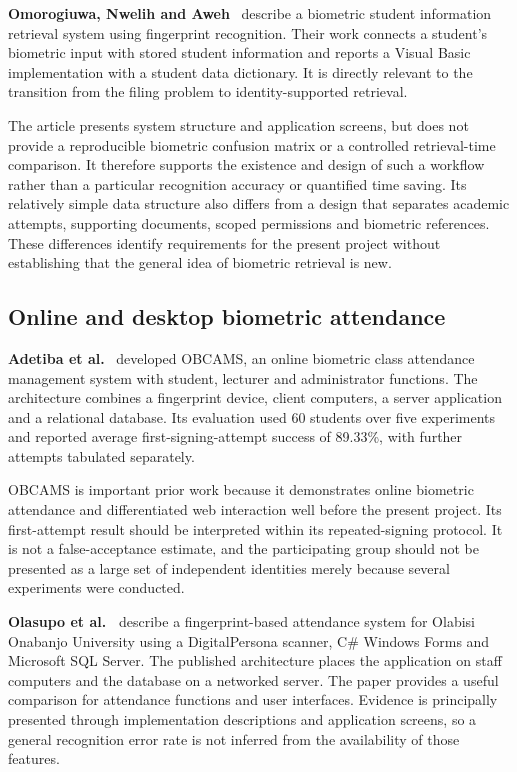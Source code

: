 \textbf{Omorogiuwa, Nwelih and Aweh}~\cite{omorogiuwa2023} describe a biometric student information retrieval system using fingerprint recognition. Their work connects a student's biometric input with stored student information and reports a Visual Basic implementation with a student data dictionary. It is directly relevant to the transition from the filing problem to identity-supported retrieval.

The article presents system structure and application screens, but does not provide a reproducible biometric confusion matrix or a controlled retrieval-time comparison. It therefore supports the existence and design of such a workflow rather than a particular recognition accuracy or quantified time saving. Its relatively simple data structure also differs from a design that separates academic attempts, supporting documents, scoped permissions and biometric references. These differences identify requirements for the present project without establishing that the general idea of biometric retrieval is new.

\subsection{Online and desktop biometric attendance}\label{sec:2-7-3}

\textbf{Adetiba et al.}~\cite{adetiba2013} developed OBCAMS, an online biometric class attendance management system with student, lecturer and administrator functions. The architecture combines a fingerprint device, client computers, a server application and a relational database. Its evaluation used 60 students over five experiments and reported average first-signing-attempt success of 89.33\%, with further attempts tabulated separately.

OBCAMS is important prior work because it demonstrates online biometric attendance and differentiated web interaction well before the present project. Its first-attempt result should be interpreted within its repeated-signing protocol. It is not a false-acceptance estimate, and the participating group should not be presented as a large set of independent identities merely because several experiments were conducted.

\textbf{Olasupo et al.~}\cite{olasupo2022} describe a fingerprint-based attendance system for Olabisi Onabanjo University using a DigitalPersona scanner, C\# Windows Forms and Microsoft SQL Server. The published architecture places the application on staff computers and the database on a networked server. The paper provides a useful comparison for attendance functions and user interfaces. Evidence is principally presented through implementation descriptions and application screens, so a general recognition error rate is not inferred from the availability of those features.

